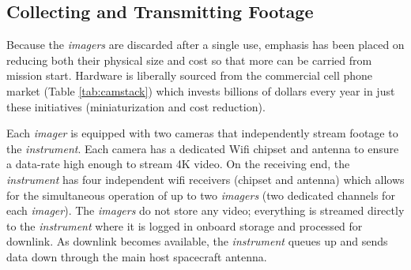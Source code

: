 \documentclass{tufte-handout}
\begin{document}

\subsection{Collecting and Transmitting Footage}

Because the \textit{imagers} are discarded after a single use, emphasis has been placed on 
reducing both their physical size and cost so that more can be carried from 
mission start. Hardware is liberally sourced from the commercial cell 
phone market (Table \ref{tab:camstack}) which invests billions of dollars 
every year in just these initiatives (miniaturization and cost reduction). 

Each \textit{imager} is equipped with two cameras that independently stream
footage to the \textit{instrument}. Each camera has a dedicated Wifi chipset and
antenna to ensure a data-rate high enough to stream 4K video. On the receiving
end, the \textit{instrument} has four independent wifi receivers (chipset and antenna) which 
allows for the simultaneous operation of up to two \textit{imagers} (two dedicated 
channels for each \textit{imager}). The \textit{imagers} do not store any video; everything is 
streamed directly to the \textit{instrument} where it is logged in onboard storage and 
processed for downlink. As downlink becomes available, the \textit{instrument} queues 
up and sends data down through the main host spacecraft antenna.
\end{document}
